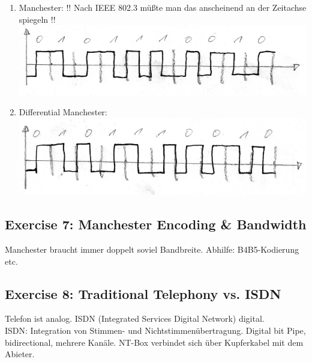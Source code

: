 \documentclass[10pt,a4paper]{scrartcl}
\begin{document}
\begin{enumerate}
\item Manchester: !! Nach IEEE 802.3 müßte man das anscheinend an der Zeitachse spiegeln !!\\\includegraphics{a3e6_4.jpg}
\item Differential Manchester: \\\includegraphics{a3e6_5.jpg}
\end{enumerate}

\subsection*{Exercise 7: Manchester Encoding \& Bandwidth}
Manchester braucht immer doppelt soviel Bandbreite. Abhilfe: B4B5-Kodierung etc. 

\subsection*{Exercise 8: Traditional Telephony vs. ISDN}
Telefon ist analog. ISDN (Integrated Services Digital Network) digital.\\
ISDN: Integration von Stimmen- und Nichtstimmenübertragung. Digital bit Pipe, bidirectional, mehrere Kanäle. NT-Box verbindet sich über Kupferkabel mit dem Abieter. 
\end{document}
